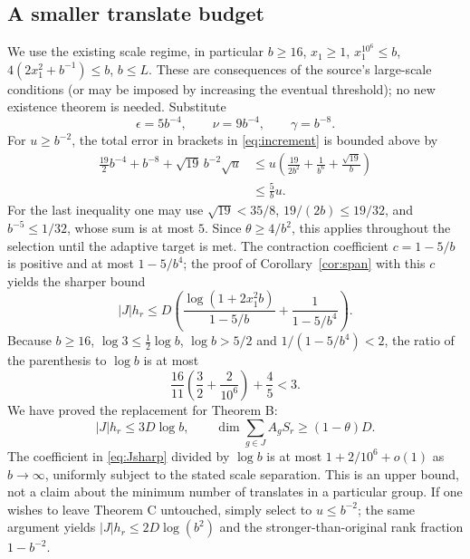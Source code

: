 \documentclass[11pt]{article}
\theoremstyle{remark}\newtheorem{remark}[theorem]{Remark}
\begin{document}
\subsection{A smaller translate budget}
We use the existing scale regime, in particular $b\ge16$, $x_1\ge1$, $x_1^{10^6}\le b$, $4(2x_1^2+b^{-1})\le b$, $b\le L$. These are consequences of the source's large-scale conditions (or may be imposed by increasing the eventual threshold); no new existence theorem is needed. Substitute
\[
\epsilon=5b^{-4},\qquad\nu=9b^{-4},\qquad\gamma=b^{-8}.
\]
For $u\ge b^{-2}$, the total error in brackets in \eqref{eq:increment} is bounded above by
\begin{align*}
\frac{19}{2}b^{-4}+b^{-8}+\sqrt{19}\,b^{-2}\sqrt u
&\le u\left(\frac{19}{2b^2}+\frac1{b^6}+\frac{\sqrt{19}}b\right)\\
&\le \frac5b u.
\end{align*}
For the last inequality one may use $\sqrt{19}<35/8$, $19/(2b)\le19/32$, and $b^{-5}\le1/32$, whose sum is at most $5$. Since $\theta\ge4/b^2$, this applies throughout the selection until the adaptive target is met. The contraction coefficient $c=1-5/b$ is positive and at most $1-5/b^4$; the proof of Corollary~\ref{cor:span} with this $c$ yields the sharper bound
\begin{equation}\label{eq:Jsharp}
|J|h_r\le D\left(\frac{\log(1+2x_1^2b)}{1-5/b}+\frac1{1-5/b^4}\right).
\end{equation}
Because $b\ge16$, $\log3\le\tfrac12\log b$, $\log b>5/2$ and $1/(1-5/b^4)<2$, the ratio of the parenthesis to $\log b$ is at most
\[
\frac{16}{11}\left(\frac32+\frac2{10^6}\right)+\frac45<3.
\]
We have proved the replacement for Theorem B:
\begin{equation}\label{eq:Bnew}
\boxed{|J|h_r\le3D\log b,\qquad\dim\sum_{g\in J} A_gS_r\ge(1-\theta)D.}
\end{equation}
The coefficient in \eqref{eq:Jsharp} divided by $\log b$ is at most $1+2/10^6+o(1)$ as $b\to\infty$, uniformly subject to the stated scale separation. This is an upper bound, not a claim about the minimum number of translates in a particular group. If one wishes to leave Theorem C untouched, simply select to $u\le b^{-2}$; the same argument yields $|J|h_r\le2D\log(b^2)$ and the stronger-than-original rank fraction $1-b^{-2}$.
\end{document}
